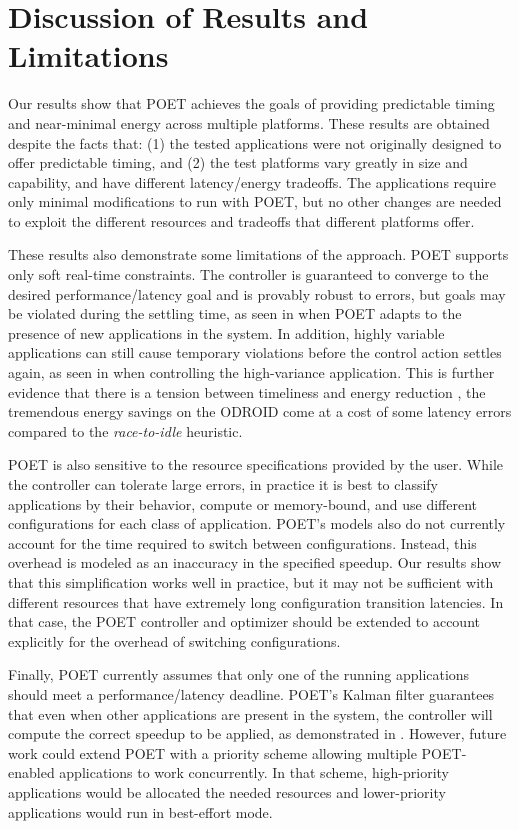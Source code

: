 \section{Discussion of Results and Limitations}

Our results show that POET achieves the goals of providing predictable timing and near-minimal energy across multiple platforms.
These results are obtained despite the facts that: (1) the tested applications were not originally designed to offer predictable timing, and (2) the test platforms vary greatly in size and capability, and have different latency/energy tradeoffs.
The applications require only minimal modifications to run with POET, but no other changes are needed to exploit the different resources and tradeoffs that different platforms offer.

These results also demonstrate some limitations of the approach.
POET supports only soft real-time constraints.
The controller is guaranteed to converge to the desired performance/latency goal and is provably robust to errors, but goals may be violated during the settling time, as seen in  when POET adapts to the presence of new applications in the system.
In addition, highly variable applications can still cause temporary violations before the control action settles again, as seen in  when controlling the high-variance  application.
This is further evidence that there is a tension between timeliness and energy reduction \cite{Abeni}, \eg the tremendous energy savings on the ODROID come at a cost of some latency errors compared to the \emph{race-to-idle} heuristic.

POET is also sensitive to the resource specifications provided by the user.
While the controller can tolerate large errors, in practice it is best to classify applications by their behavior, \eg compute or memory-bound, and use different configurations for each class of application.
POET's models also do not currently account for the time required to switch between configurations.
Instead, this overhead is modeled as an inaccuracy in the specified speedup.
Our results show that this simplification works well in practice, but it may not be sufficient with different resources that have extremely long configuration transition latencies.
In that case, the POET controller and optimizer should be extended to account explicitly for the overhead of switching configurations.

Finally, POET currently assumes that only one of the running applications should meet a performance/latency deadline.
POET's Kalman filter guarantees that even when other applications are present in the system, the controller will compute the correct speedup to be applied, as demonstrated in .
However, future work could extend POET with a priority scheme allowing multiple POET-enabled applications to work concurrently.
In that scheme, high-priority applications would be allocated the needed resources and lower-priority applications would run in best-effort mode.
